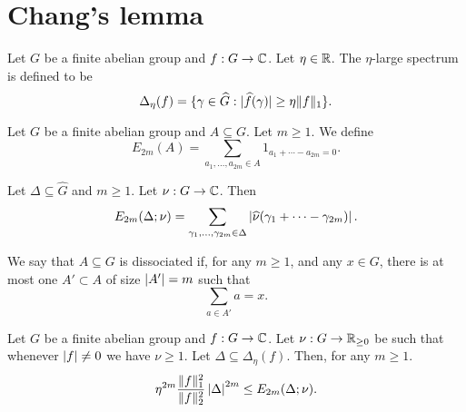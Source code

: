 \chapter{Chang's lemma}

\begin{definition}
\label{large_spec}
Let $G$ be a finite abelian group and $f:G\to\mathbb{C}$. Let $\eta\in \mathbb{R}$. The $\eta$-large spectrum is defined to be
\[\Delta_\eta(f) = \{ \gamma\in\widehat{G} : \lvert \widehat{f}(\gamma)\rvert \geq \eta\lVert f\rVert_1\}.\]
\end{definition}


\begin{definition}[Energy]
\label{energy}
Let $G$ be a finite abelian group and $A\subseteq G$. Let $m\geq 1$. We define
\[E_{2m}(A)=\sum_{a_1,\ldots,a_{2m}\in A}1_{a_1+\cdots-a_{2m}=0}.\]
\end{definition}


\begin{definition}
\label{weight_energy}
\leanok
Let $\Delta\subseteq \widehat{G}$ and $m\geq 1$. Let $\nu:G\to \mathbb{C}$. Then
\[E_{2m}(\Delta;\nu)=\sum_{\gamma_1,\ldots,\gamma_{2m}\in \Delta}\left\lvert \widehat{\nu}(\gamma_1+\cdots-\gamma_{2m})\right\rvert.\]
\end{definition}


\begin{definition}[Dissociation]
\label{dissociated}
\leanok
We say that $A\subseteq G$ is dissociated if, for any $m\geq 1$, and any $x\in G$, there is at most one $A'\subset A$ of size $\left\lvert A'\right\rvert=m$ such that
\[\sum_{a\in A'}a=x.\]
\end{definition}


\begin{lemma}
\label{general_hoelder}
Let $G$ be a finite abelian group and $f:G\to\mathbb{C}$. Let $\nu:G\to \mathbb{R}_{\geq 0}$ be such that whenever $\left\lvert f\right\rvert\neq 0$ we have $\nu \geq 1$. Let $\Delta\subseteq \Delta_\eta(f)$. Then, for any $m\geq 1$.
\[\eta^{2m}\frac{\lVert f\rVert_1^2}{\lVert f\rVert_2^2}\left\lvert \Delta\right\rvert^{2m}\leq E_{2m}(\Delta;\nu).\]
\end{lemma}

